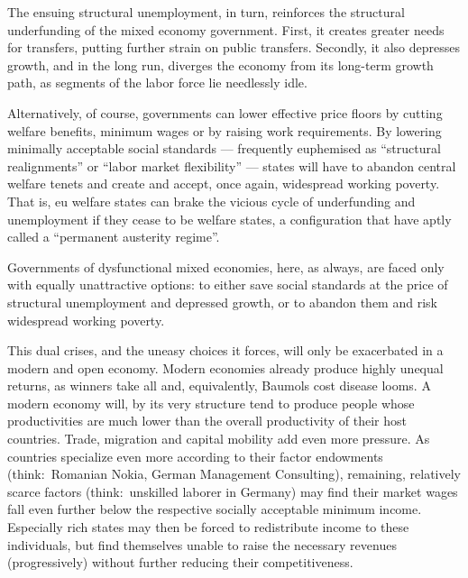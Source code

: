 The ensuing structural unemployment, in turn, reinforces the structural underfunding of the mixed economy government.
First, it creates greater needs for transfers, putting further strain on public transfers.
Secondly, it also depresses growth, and in the long run, diverges the economy from its long-term growth path, as segments of the labor force lie needlessly idle.


Alternatively, of course, governments can lower effective price floors by cutting welfare benefits, minimum wages or by raising work requirements.
By lowering minimally acceptable social standards --- frequently euphemised as ``structural realignments'' or ``labor market flexibility'' --- states will have to abandon central welfare tenets and create and accept, once again, widespread working poverty.
That is, \gls{eu} welfare states can brake the vicious cycle of underfunding and unemployment if they cease to be welfare states, a configuration that \cite{StreeckMertens2010} have aptly called a ``permanent austerity regime''.

Governments of dysfunctional mixed economies, here, as always, are faced only with equally unattractive options:
to either save social standards at the price of structural unemployment and depressed growth, or to abandon them and risk widespread working poverty.

This dual crises, and the uneasy choices it forces, will only be exacerbated in a modern and open economy.
Modern economies already produce highly unequal returns, as winners take all and, equivalently, Baumols cost disease looms.
A modern economy will, by its very structure tend to produce people whose productivities are much lower than the overall productivity of their host countries.
Trade, migration and capital mobility add even more pressure.
As countries specialize even more according to their factor endowments (think:\ Romanian Nokia, German Management Consulting), remaining, relatively scarce factors (think:\ unskilled laborer in Germany) may find their market wages fall even further below the respective socially acceptable minimum income.
Especially rich states may then be forced to redistribute income to these individuals, but find themselves unable to raise the necessary revenues (progressively) without further reducing their competitiveness.

